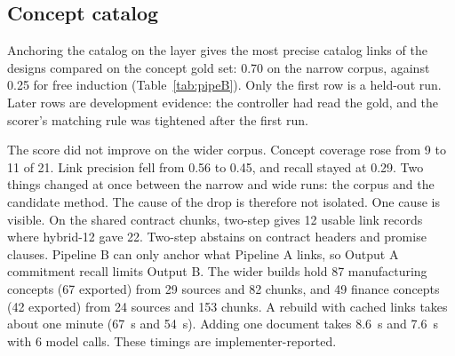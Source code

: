 \documentclass[11pt,a4paper]{article}
\begin{document}
\subsection{Concept catalog}\label{sec:res-catalog-build}
Anchoring the catalog on the layer gives the most precise catalog links of the designs compared on the concept gold set: 0.70 on the narrow corpus, against 0.25 for free induction (Table~\ref{tab:pipeB}). Only the first row is a held-out run. Later rows are development evidence: the controller had read the gold, and the scorer's matching rule was tightened after the first run.
\begin{table}[H]
\centering\small
\caption{Pipeline B, concept gold set (39 concepts; manufacturing has 21 gold concepts and 17 gold links). First row held-out; later rows development data. The last two rows use the wider corpus and the two-step default.}
\label{tab:pipeB}
\end{table}

The score did not improve on the wider corpus. Concept coverage rose from 9 to 11 of 21. Link precision fell from 0.56 to 0.45, and recall stayed at 0.29. %
Two things changed at once between the narrow and wide runs: the corpus and the candidate method. The cause of the drop is therefore not isolated. One cause is visible. On the shared contract chunks, two-step gives 12 usable link records where hybrid-12 gave 22. Two-step abstains on contract headers and promise clauses. Pipeline B can only anchor what Pipeline A links, so Output A commitment recall limits Output B. %
The wider builds hold 87 manufacturing concepts (67 exported) from 29 sources and 82 chunks, and 49 finance concepts (42 exported) from 24 sources and 153 chunks. %
A rebuild with cached links takes about one minute (67~s and 54~s). Adding one document takes 8.6~s and 7.6~s with 6 model calls. These timings are implementer-reported. %
\end{document}
